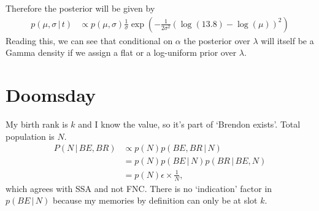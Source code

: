 \documentclass[a4paper, 12pt]{article}
\newcommand{\given}{\,|\,}
\begin{document}
Therefore the posterior will be given by
\begin{align}
p(\mu, \sigma \given t) &\propto
    p(\mu, \sigma) \frac{1}{\sigma}
    \exp\left(-\frac{1}{2\sigma^2}\left(\log(13.8) - \log(\mu)\right)^2\right)
\end{align}
Reading this, we can see that conditional on $\alpha$ the posterior over
$\lambda$ will itself be a Gamma density if we assign a flat or a log-uniform
prior over $\lambda$.

\section{Doomsday}
My birth rank is $k$ and I know the value, so it's part of `Brendon exists'.
Total population is $N$.
\begin{align}
P(N \given BE, BR) &\propto p(N)p(BE, BR \given N) \\
    &= p(N)p(BE \given N)p(BR \given BE, N) \\
    &= p(N)\epsilon \times \frac{1}{N},
\end{align}
which agrees with SSA and not FNC. There is no `indication' factor
in $p(BE \given N)$ because my memories by definition can only be at slot $k$.
\end{document}
